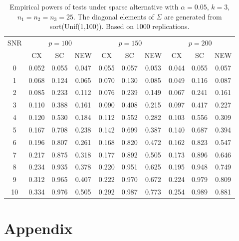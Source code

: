 \documentclass[review]{elsarticle}
\theoremstyle{plain}
\theoremstyle{definition}
\theoremstyle{remark}
\begin{document}
\begin{table}[!hbp]
    \caption{Empirical powers of tests under sparse alternative with $\alpha=0.05$, $k=3$, $n_1=n_2=n_3=25$. The diagonal elements of $\Sigma$ are generated from sort(Unif(1,100)). Based on $1000$ replications.}
    \centering
\begin{tabular}{*{10}{c}}
\toprule
\multirow{2}{*}{SNR} &\multicolumn{3}{c}{$p=100$}&\multicolumn{3}{c}{$p=150$}&\multicolumn{3}{c}{$p=200$} \\
    \cmidrule(r){2-4}\cmidrule(r){5-7}\cmidrule(r){8-10}
        & CX & SC & NEW & CX &SC &NEW &CX & SC & NEW\\
\midrule
0 & 0.052 & 0.055 & 0.047 & 0.055 & 0.057 & 0.053 & 0.044 & 0.055 & 0.057 \\ 
1 & 0.068 & 0.124 & 0.065 & 0.070 & 0.130 & 0.085 & 0.049 & 0.116 & 0.087 \\ 
2 & 0.085 & 0.233 & 0.112 & 0.076 & 0.239 & 0.149 & 0.067 & 0.241 & 0.161 \\ 
3 & 0.110 & 0.388 & 0.161 & 0.090 & 0.408 & 0.215 & 0.097 & 0.417 & 0.227 \\ 
4 & 0.120 & 0.530 & 0.184 & 0.112 & 0.552 & 0.282 & 0.103 & 0.556 & 0.309 \\ 
5 & 0.167 & 0.708 & 0.238 & 0.142 & 0.699 & 0.387 & 0.140 & 0.687 & 0.394 \\ 
6 & 0.196 & 0.807 & 0.261 & 0.168 & 0.820 & 0.472 & 0.162 & 0.823 & 0.547 \\ 
7 & 0.217 & 0.875 & 0.318 & 0.177 & 0.892 & 0.505 & 0.173 & 0.896 & 0.646 \\ 
8 & 0.234 & 0.935 & 0.378 & 0.220 & 0.951 & 0.625 & 0.195 & 0.948 & 0.749 \\ 
9 & 0.312 & 0.965 & 0.407 & 0.222 & 0.970 & 0.672 & 0.224 & 0.979 & 0.809 \\ 
10 & 0.334 & 0.976 & 0.505 & 0.292 & 0.987 & 0.773 & 0.254 & 0.989 & 0.881 \\ 
\bottomrule
\end{tabular}
\end{table}



\section{Appendix}
\end{document}
